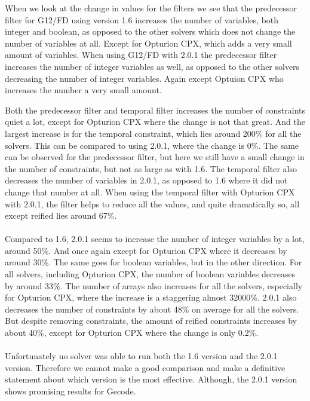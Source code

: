 







When we look at the change in values for the filters we see that the predecessor filter for G12/FD using version 1.6 increases the number of variables, both integer and boolean, as opposed to the other solvers which does not change the number of variables at all. Except for Opturion CPX, which adds a very small amount of variables. When using G12/FD with 2.0.1 the predecessor filter increases the number of integer variables as well, as opposed to the other solvers decreasing the number of integer variables. Again except Optuion CPX who increases the number a very small amount.

Both the predecessor filter and temporal filter increases the number of constraints quiet a lot, except for Opturion CPX where the change is not that great. And the largest increase is for the temporal constraint, which lies around 200\% for all the solvers. This can be compared to using 2.0.1, where the change is 0\%. The same can be observed for the predecessor filter, but here we still have a small change in the number of constraints, but not as large as with 1.6. The temporal filter also decreases the number of variables in 2.0.1, as opposed to 1.6 where it did not change that number at all. When using the temporal filter with Opturion CPX with 2.0.1, the filter helps to reduce all the values, and quite dramatically so, all except reified lies around 67\%.
\\\\
Compared to 1.6, 2.0.1 seems to increase the number of integer variables by a lot, around 50\%. And once again except for Opturion CPX where it decreases by around 30\%. The same goes for boolean variables, but in the other direction. For all solvers, including Opturion CPX, the number of boolean variables decreases by around 33\%. The number of arrays also increases for all the solvers, especially for Opturion CPX, where the increase is a staggering almost 32000\%. 2.0.1 also decreases the number of constraints by about 48\% on average for all the solvers. But despite removing constraints, the amount of reified constraints increases by about 40\%, except for Opturion CPX where the change is only 0.2\%.
\\\\
Unfortunately no solver was able to run both the 1.6 version and the 2.0.1 version. Therefore we cannot make a good comparison and make a definitive statement about which version is the most effective. Although, the 2.0.1 version shows promising results for Gecode.

